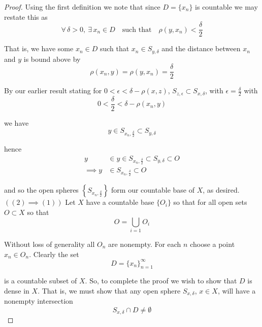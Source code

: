 \documentclass[12pt]{article}
\newlength\tindent
\renewcommand{\indent}{\hspace*{\tindent}}
\begin{document}
{\begin{proof}
Using the first definition we note that since $D = \{x_n\}$ is countable we may restate this as
\begin{equation*}
	\forall\,\delta > 0, ~\exists\,x_n\in D \quad \text{such that} \quad \rho(y, x_n) < \frac{\delta}{2}
\end{equation*}

\indent That is, we have some $x_n \in D$ such that $x_n \in S_{y, \delta}$ and the distance between $x_n$ and $y$ is bound above by
\begin{equation*}
	\rho(x_n, y) = \rho(y, x_n) = \frac{\delta}{2}
\end{equation*}

By our earlier result stating for $0 < \epsilon < \delta - \rho(x, z)$, $S_{z,\epsilon} \subset S_{x, \delta}$, with $\epsilon = \frac{\delta}{2}$ with
\begin{equation*}
	0 < \frac{\delta}{2} < \delta - \rho(x_n, y)
\end{equation*}

we have
\begin{equation*}
	y \in S_{x_n,\frac{\delta}{2}} \subset S_{y,\delta}
\end{equation*}

hence
\begin{align*}
	y &\in y \in S_{x_n,\frac{\delta}{2}} \subset S_{y,\delta} \subset O \\
	\implies y &\in S_{x_n,\frac{\delta}{2}} \subset O
\end{align*}

and so the open spheres $\left\{S_{x_n, \frac{\delta}{2}}\right\}$ form our countable base of $X$, as desired. \\

$((2) \implies (1))$ Let $X$ have a countable base $\{O_i\}$ so that for all open sets $O \subset X$ so that
\begin{equation*}
	O = \bigcup_{i = 1} O_i
\end{equation*}

\indent Without loss of generality all $O_n$ are nonempty. For each $n$ choose a point $x_n \in O_n$. Clearly the set 
\begin{equation*}
	D = \{x_n\}^\infty_{n = 1} 
\end{equation*}

is a countable subset of $X$. So, to complete the proof we wish to show that $D$ is dense in $X$. That is, we must show that any open sphere $S_{x, \delta}$, $x \in X$, will have a nonempty intersection
\begin{equation*}
	S_{x,\delta} \cap D \neq \emptyset
\end{equation*}


\end{proof}}
\end{document}
